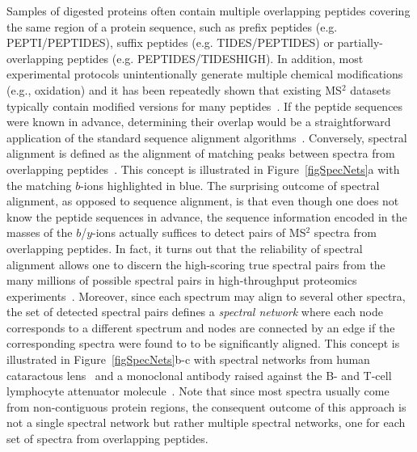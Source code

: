 \documentclass[8.5pt,twoside,twocolumn]{article}
\begin{document}
Samples of digested proteins often contain multiple overlapping peptides covering the same region of a protein sequence, such as prefix peptides (e.g. PEPTI/PEPTIDES), suffix peptides (e.g. TIDES/PEPTIDES) or partially-overlapping peptides (e.g. PEPTIDES/TIDESHIGH). In addition, most experimental protocols unintentionally generate multiple chemical modifications (e.g., oxidation) and it has been repeatedly shown that existing MS$^2$ datasets typically contain modified versions for many peptides~\cite{Hunyadi-Gulyas04, tanner05,tsur05,Wilmarth06}.
%
If the peptide sequences were known in advance, determining their overlap would be a straightforward application of the standard sequence alignment algorithms~\cite{smith81}. Conversely, spectral alignment is defined as the alignment of matching peaks between spectra from overlapping peptides~\cite{pevzner00,bandeira06}. This concept is illustrated in \mbox{Figure~\ref{figSpecNets}a} with the matching $b$-ions highlighted in blue. The surprising outcome of spectral alignment, as opposed to sequence alignment, is that even though one does not know the peptide sequences in advance, the sequence information encoded in the masses of the $b$/$y$-ions actually suffices to detect pairs of MS$^2$ spectra from overlapping peptides. In fact, it turns out that the reliability of spectral alignment allows one to discern the high-scoring true spectral pairs from the many millions of possible spectral pairs in high-throughput proteomics experiments~\cite{bandeira06,bandeira07pnas}. Moreover, since each spectrum may align to several other spectra, the set of detected spectral pairs defines a \emph{spectral network} where each node corresponds to a different spectrum and nodes are connected by an edge if the corresponding spectra were found to to be significantly aligned. This concept is illustrated in \mbox{Figure~\ref{figSpecNets}b-c} with spectral networks from human cataractous lens~\cite{bandeira07pnas} and a monoclonal antibody raised against the B- and T-cell lymphocyte attenuator molecule~\cite{bandeira08natbio}. Note that since most spectra usually come from non-contiguous protein regions, the consequent outcome of this approach is not a single spectral network but rather multiple spectral networks, one for each set of spectra from overlapping peptides.
\end{document}
